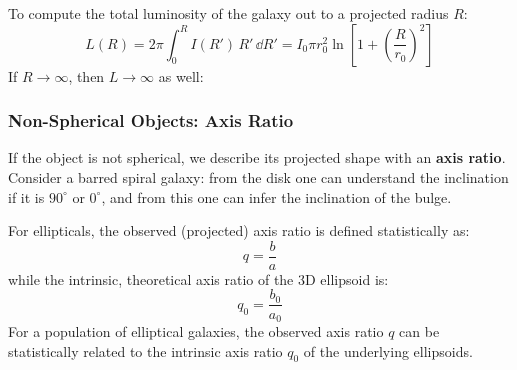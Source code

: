 To compute the total luminosity of the galaxy out to a projected radius $R$:
$$
L(R) = 2\pi\int_0^R I(R')\,R'\,\dd{R'} = I_0 \pi r_0^2 \ln\left[1 + \left(\frac{R}{r_0}\right)^2\right]
$$
If $R \to \infty$, then $L \to \infty$ as well:


\bigskip
\subsubsection{Non-Spherical Objects: Axis Ratio}

\begin{minipage}{0.52\textwidth}
    If the object is not spherical, we describe its projected shape with an \textbf{axis ratio}. Consider a barred spiral galaxy: from the disk one can understand the inclination if it is $90^\circ$ or $0^\circ$, and from this one can infer the inclination of the bulge.

    For ellipticals, the observed (projected) axis ratio is defined statistically as:
    $$
    q = \frac{b}{a}
    $$
    while the intrinsic, theoretical axis ratio of the 3D ellipsoid is:
    $$
    q_0 = \frac{b_0}{a_0}
    $$
    For a population of elliptical galaxies, the observed axis ratio $q$ can be statistically related to the intrinsic axis ratio $q_0$ of the underlying ellipsoids.
\end{minipage}%
\hfill
